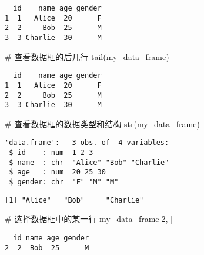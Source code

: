\documentclass[
  letterpaper,
  DIV=11,
  numbers=noendperiod]{scrreprt}
\newenvironment{Shaded}{\begin{snugshade}}{\end{snugshade}}
\newcommand{\CommentTok}[1]{\textcolor[rgb]{0.37,0.37,0.37}{#1}}
\newcommand{\DecValTok}[1]{\textcolor[rgb]{0.68,0.00,0.00}{#1}}
\newcommand{\FunctionTok}[1]{\textcolor[rgb]{0.28,0.35,0.67}{#1}}
\newcommand{\NormalTok}[1]{\textcolor[rgb]{0.00,0.23,0.31}{#1}}
\newcommand{\SpecialCharTok}[1]{\textcolor[rgb]{0.37,0.37,0.37}{#1}}
\begin{document}
\begin{verbatim}
  id    name age gender
1  1   Alice  20      F
2  2     Bob  25      M
3  3 Charlie  30      M
\end{verbatim}

\begin{Shaded}
\begin{Highlighting}[]
\CommentTok{\# 查看数据框的后几行}
\FunctionTok{tail}\NormalTok{(my\_data\_frame)}
\end{Highlighting}
\end{Shaded}

\begin{verbatim}
  id    name age gender
1  1   Alice  20      F
2  2     Bob  25      M
3  3 Charlie  30      M
\end{verbatim}

\begin{Shaded}
\begin{Highlighting}[]
\CommentTok{\# 查看数据框的数据类型和结构}
\FunctionTok{str}\NormalTok{(my\_data\_frame)}
\end{Highlighting}
\end{Shaded}

\begin{verbatim}
'data.frame':   3 obs. of  4 variables:
 $ id    : num  1 2 3
 $ name  : chr  "Alice" "Bob" "Charlie"
 $ age   : num  20 25 30
 $ gender: chr  "F" "M" "M"
\end{verbatim}

\begin{Shaded}
\end{Shaded}

\begin{verbatim}
[1] "Alice"   "Bob"     "Charlie"
\end{verbatim}

\begin{Shaded}
\begin{Highlighting}[]
\CommentTok{\# 选择数据框中的某一行}
\NormalTok{my\_data\_frame[}\DecValTok{2}\NormalTok{, ]}
\end{Highlighting}
\end{Shaded}

\begin{verbatim}
  id name age gender
2  2  Bob  25      M
\end{verbatim}
\end{document}
